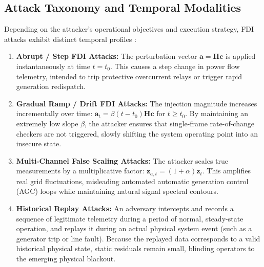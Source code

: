 \documentclass[12pt,a4paper]{report}
\begin{document}
\subsection{Attack Taxonomy and Temporal Modalities}
Depending on the attacker's operational objectives and execution strategy, FDI attacks
exhibit distinct temporal profiles \cite{habib2023,kumar2022}:
\begin{enumerate}
    \item \textbf{Abrupt / Step FDI Attacks:} The perturbation vector $\boldsymbol{a} = \boldsymbol{H}\boldsymbol{c}$
    is applied instantaneously at time $t = t_0$. This causes a step change in power flow
    telemetry, intended to trip protective overcurrent relays or trigger rapid generation
    redispatch.
    \item \textbf{Gradual Ramp / Drift FDI Attacks:} The injection magnitude increases
    incrementally over time: $\boldsymbol{a}_t = \beta (t - t_0) \boldsymbol{H}\boldsymbol{c}$
    for $t \ge t_0$. By maintaining an extremely low slope $\beta$, the attacker ensures
    that single-frame rate-of-change checkers are not triggered, slowly shifting the
    system operating point into an insecure state.
    \item \textbf{Multi-Channel False Scaling Attacks:} The attacker scales true measurements
    by a multiplicative factor: $\boldsymbol{z}_{a,t} = (1 + \alpha)\boldsymbol{z}_t$. This
    amplifies real grid fluctuations, misleading automated automatic generation control (AGC)
    loops while maintaining natural signal spectral contours.
    \item \textbf{Historical Replay Attacks:} An adversary intercepts and records a sequence
    of legitimate telemetry during a period of normal, steady-state operation, and replays
    it during an actual physical system event (such as a generator trip or line fault).
    Because the replayed data corresponds to a valid historical physical state, static
    residuals remain small, blinding operators to the emerging physical blackout.
\end{enumerate}
\end{document}
